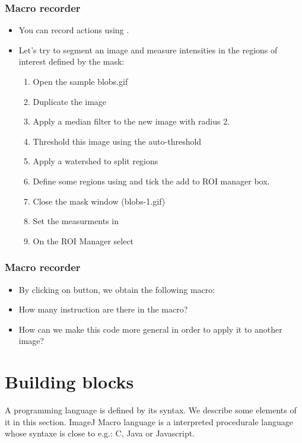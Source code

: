 \begin{frame}
  \frametitle{Macro recorder}
  \begin{itemize}
  \item You can record actions using .
  \item Let's try to segment an image and measure intensities in the
    regions of interest defined by the mask:
    \begin{enumerate}
    \item Open the sample blobs.gif 
    \item Duplicate the image 
    \item Apply a median filter to the new image  with radius 2.
    \item Threshold this image using the auto-threshold 
    \item Apply a watershed to split regions 
    \item Define some regions using  and tick the add to ROI manager box.
    \item Close the mask window (blobs-1.gif)
    \item Set the measurments in 
    \item On the ROI Manager select 
    \end{enumerate}
  \end{itemize}
\end{frame}

\begin{frame}[fragile]
  \frametitle<presentation>{Macro recorder}
  \begin{itemize}
    \item By clicking on  button, we obtain the following
    macro:\par
    
    \item How many instruction are there in the macro?
    \item How can we make this code more general in order to apply it to
      another image?
  \end{itemize}
\end{frame}

\section{Building blocks}
A programming language is defined by its syntax. We describe some
elements of it in this section. ImageJ Macro language is a interpreted
procedurale language whose syntaxe is close to e.g.: C, Java or
Javascript.
